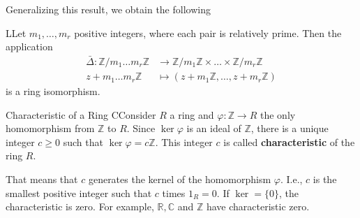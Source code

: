 \documentclass[12pt,a4paper]{article}
\begin{document}
Generalizing this result, we obtain the following 
\begin{thm}{}
LLet $m_1, \ldots, m_r$ positive integers, where each pair is relatively prime. Then the application
\begin{equation*}
\begin{aligned}
\bar{\Delta} : \mathbb{Z}/m_1\ldots m_r \mathbb{Z} & \to \mathbb{Z}/m_1\mathbb{Z} \times \ldots \times \mathbb{Z}/m_r \mathbb{Z} \\
z+m_1\ldots m_r \mathbb{Z} & \mapsto (z+m_1\mathbb{Z}, \ldots, z+m_r\mathbb{Z})
\end{aligned}
\end{equation*}
is a ring isomorphism.
\end{thm}

\begin{defn}{Characteristic of a Ring}
CConsider $R$ a ring and $\varphi: \mathbb{Z} \to R$ the only homomorphism from $\mathbb{Z}$ to $R$. Since $\ker \varphi$ is an ideal of $\mathbb{Z}$, there is a unique integer $c \geq 0$ such that $\ker \varphi = c \mathbb{Z}$. This integer $c$ is called \textbf{characteristic} of the ring $R$.
\end{defn}

That means that $c$ generates the kernel of the homomorphism $\varphi$. I.e., $c$ is the smallest positive integer such that $c$ times $1_R = 0$. If $\ker = \{ 0 \}$, the characteristic is zero. For example, $\mathbb{R}, \mathbb{C}$ and $\mathbb{Z}$ have characteristic zero.




\nocite{*}


\end{document}
